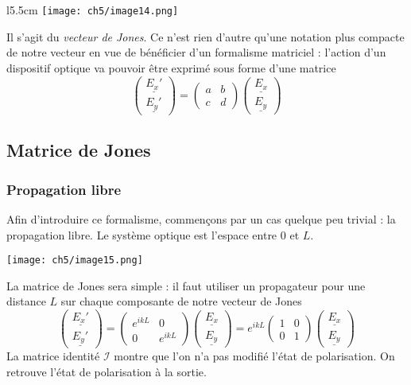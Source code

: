 		\begin{wrapfigure}[4]{l}{5.5cm}
	\vspace{-4mm}
	\texttt{[image: ch5/image14.png]}
	\end{wrapfigure}
Il s'agit du \textit{vecteur de Jones}. Ce n'est rien d'autre qu'une notation plus compacte de 
notre vecteur en vue de bénéficier d'un formalisme matriciel : l'action d'un dispositif optique 
va pouvoir être exprimé sous forme d'une matrice
\begin{equation}
\left(\begin{array}{c}
\underline{E_x'}\\
\underline{E_y'}
\end{array}\right) = \left(\begin{array}{cc}
a & b\\
c & d
\end{array}\right)\left(\begin{array}{c}
\underline{E_x}\\
\underline{E_y}
\end{array}\right)
\end{equation}

\subsection{Matrice de Jones}
	\subsubsection{Propagation libre}
Afin d'introduire ce formalisme, commençons par un cas quelque peu trivial : la propagation libre. 
Le système optique est l'espace entre $0$ et $L$. 
\begin{center}
	\texttt{[image: ch5/image15.png]}
\end{center}
La matrice de Jones sera simple : il faut utiliser 
un propagateur pour une distance $L$ sur chaque composante de notre vecteur de Jones
\begin{equation}
\left(\begin{array}{c}
\underline{E_x'}\\
\underline{E_y'}
\end{array}\right) = \left(\begin{array}{cc}
e^{ikL} & 0\\
0 & e^{ikL}
\end{array}\right)\left(\begin{array}{c}
\underline{E_x}\\
\underline{E_y}
\end{array}\right) = e^{ikL}\left(\begin{array}{cc}
1 & 0\\
0 & 1
\end{array}\right)\left(\begin{array}{c}
\underline{E_x}\\
\underline{E_y}
\end{array}\right)
\end{equation}
La matrice identité $\mathcal{I}$ montre que l'on n'a pas modifié l'état de polarisation. On retrouve 
l'état de polarisation à la sortie.

